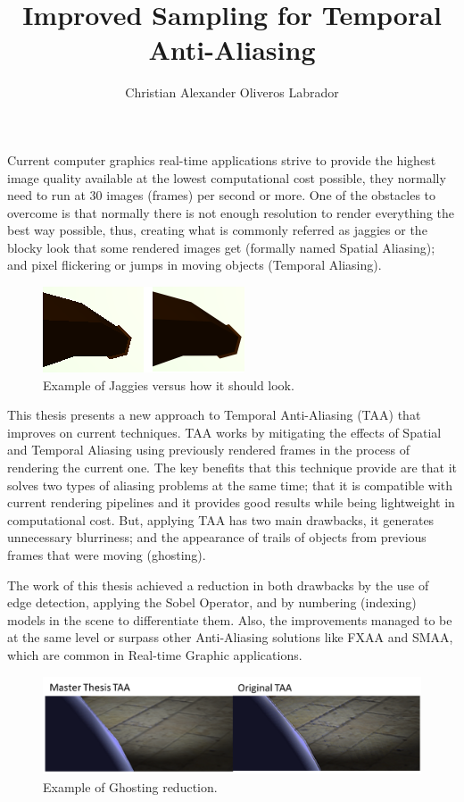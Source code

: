 \documentclass{popsci}
\author{Christian Alexander Oliveros Labrador}
\title{Improved Sampling for Temporal Anti-Aliasing}
\begin{document}


{\noindent Current computer graphics real-time applications strive to provide the highest image quality available at the lowest computational cost possible, they normally need to run at 30 images (frames) per second or more. One of the obstacles to overcome is that normally there is not enough resolution to render everything the best way possible, thus, creating what is commonly referred as jaggies or the blocky look that some rendered images get (formally named Spatial Aliasing); and pixel flickering or jumps in moving objects (Temporal Aliasing).   
	
\begin{figure}[!hbt]
	\centering
	\includegraphics[scale=1.0]{images/pipe_sobel_no_aa.png}
	\caption{Example of Jaggies versus how it should look.}\label{fig:jaggies}
\end{figure}
	
This thesis presents a new approach to Temporal Anti-Aliasing (TAA) that improves on current techniques. TAA works by mitigating the effects of Spatial and Temporal Aliasing using previously rendered frames in the process of rendering the current one. The key benefits that this technique provide are that it solves two types of aliasing problems at the same time; that it is compatible with current rendering pipelines and it provides good results while being lightweight in computational cost. But, applying TAA has two main drawbacks, it generates unnecessary blurriness; and the appearance of trails of objects from previous frames that were moving (ghosting). 

The work of this thesis achieved a reduction in both drawbacks by the use of edge detection, applying the Sobel Operator, and by numbering (indexing) models in the scene to differentiate them. Also, the improvements managed to be at the same level or surpass other Anti-Aliasing solutions like FXAA and SMAA, which are common in Real-time Graphic applications.

\begin{figure}[!hbt]
	\centering
	\includegraphics[scale=0.65]{images/ghosting.png}
	\caption{Example of Ghosting reduction.}\label{fig:ghosting}
\end{figure}
	
}
\end{document}
